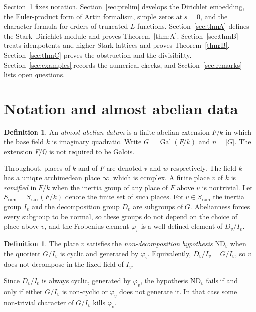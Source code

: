 \documentclass[11pt]{article}
\theoremstyle{plain}
\theoremstyle{definition}
\newtheorem{definition}[theorem]{Definition}
\theoremstyle{remark}
\newcommand{\Q}{\mathbb{Q}}
\newcommand{\Gal}{\operatorname{Gal}}
\newcommand{\ram}{\mathrm{ram}}
\begin{document}
Section~\ref{sec:notation} fixes notation.
Section~\ref{sec:prelim} develops the Dirichlet embedding, the Euler-product form of Artin formalism, simple zeros at $s=0$, and the character formula for orders of truncated $L$-functions.
Section~\ref{sec:thmA} defines the Stark--Dirichlet module and proves Theorem~\ref{thm:A}.
Section~\ref{sec:thmB} treats idempotents and higher Stark lattices and proves Theorem~\ref{thm:B}.
Section~\ref{sec:thmC} proves the obstruction and the divisibility.
Section~\ref{sec:examples} records the numerical checks, and Section~\ref{sec:remarks} lists open questions.

\section{Notation and almost abelian data}
\label{sec:notation}

\begin{definition}
\label{def:datum}
An \emph{almost abelian datum} is a finite abelian extension $F/k$ in which the base field $k$ is imaginary quadratic.
Write $G=\Gal(F/k)$ and $n=|G|$.
The extension $F/\Q$ is not required to be Galois.
\end{definition}

Throughout, places of $k$ and of $F$ are denoted $v$ and $w$ respectively.
The field $k$ has a unique archimedean place $\infty$, which is complex.
A finite place $v$ of $k$ is \emph{ramified} in $F/k$ when the inertia group of any place of $F$ above $v$ is nontrivial.
Let $S_{\ram}=S_{\ram}(F/k)$ denote the finite set of such places.
For $v\in S_{\ram}$ the inertia group $I_v$ and the decomposition group $D_v$ are subgroups of $G$.
Abelianness forces every subgroup to be normal, so these groups do not depend on the choice of place above $v$, and the Frobenius element $\varphi_v$ is a well-defined element of $D_v/I_v$.

\begin{definition}
\label{def:ND}
The place $v$ satisfies the \emph{non-decomposition hypothesis} $\mathrm{ND}_v$ when the quotient $G/I_v$ is cyclic and generated by $\varphi_v$.
Equivalently, $D_v/I_v=G/I_v$, so $v$ does not decompose in the fixed field of $I_v$.
\end{definition}

Since $D_v/I_v$ is always cyclic, generated by $\varphi_v$, the hypothesis $\mathrm{ND}_v$ fails if and only if either $G/I_v$ is non-cyclic or $\varphi_v$ does not generate it.
In that case some non-trivial character of $G/I_v$ kills $\varphi_v$.
\end{document}

